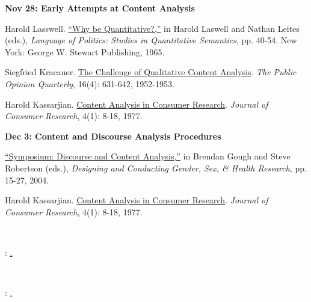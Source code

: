 \documentclass[letterpaper]{article}
\renewenvironment{itemize}{
  \begin{list}{}{
    \setlength{\leftmargin}{1.5em}
  }
}{
  \end{list}
}
\begin{document}
\begin{enumerate}
		\begin{itemize}
		\item {\bf Nov 28: Early Attempts at Content Analysis}
			\begin{itemize}
				\item[$\bullet$] Harold Lasswell. \href{https://us.corwin.com/sites/default/files/upm-binaries/19018_Franzosi_V1_Ch01.pdf}{``Why be Quantitative?,''} in Harold Laswell and Nathan Leites (eds.), \emph{Language of Politics: Studies in Quantitative Semantics}, pp. 40-54. New York: George W. Stewart Publishing, 1965.
				\item[$\bullet$] Siegfried Kracauer. \href{http://www.jstor.org/stable/2746123}{The Challenge of Qualitative Content Analysis}. \emph{The Public Opinion Quarterly}, 16(4): 631-642, 1952-1953. 
				\item[$\bullet$] Harold Kassarjian. \href{http://www.jstor.org/stable/2488631}{Content Analysis in Consumer Research}. \emph{Journal of Consumer Research}, 4(1): 8-18, 1977.
			\end{itemize}
		\end{itemize}

		
		\begin{itemize}
		\item {\bf Dec 3: Content and Discourse Analysis Procedures}
			\begin{itemize}
				\item[$\bullet$] \href{https://wcfia.harvard.edu/files/wcfia/files/870_symposium.pdf}{``Symposium: Discourse and Content Analysis,''} in Brendan Gough and Steve Robertson (eds.), \emph{Designing and Conducting Gender, Sex, \& Health Research}, pp. 15-27, 2004.
				\item[$\bullet$] Harold Kassarjian. \href{http://www.jstor.org/stable/2488631}{Content Analysis in Consumer Research}. \emph{Journal of Consumer Research}, 4(1): 8-18, 1977.
			\end{itemize}
		\end{itemize}

~\\
\item[] \begin{center}{\color{blue}{\bf Final Presentations/``Conference''}: \underline{{\unskip}.}}\end{center}
~\\


\item[] \begin{center}{\color{blue}{\bf Final Exam}: \underline{{\unskip}.}}\end{center}
~\\

\end{enumerate}







 








\newpage
{}
\setcounter{page}{1}
\printbibliography
\end{document}
